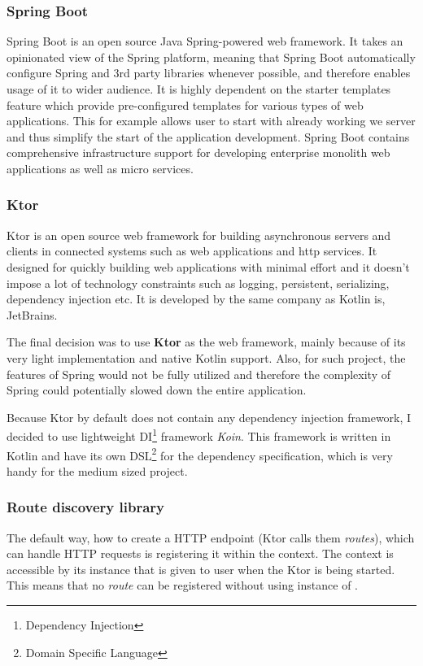 \subsubsection{Spring Boot}
Spring Boot\cite{springBootReference} is an open source Java Spring-powered web framework.
It takes an opinionated view of the Spring platform,
meaning that Spring Boot automatically configure Spring and 3rd party libraries whenever possible,
and therefore enables usage of it to wider audience.
It is highly dependent on the starter templates feature which provide pre-configured templates for various types of web applications.
This for example allows user to start with already working we server
and thus simplify the start of the application development\cite{springBootGithubReference}.
Spring Boot contains comprehensive infrastructure support for developing enterprise monolith web applications as well as micro services\cite{springBootGithubReference}.

\subsubsection{Ktor}\label{subsubsec:ktor}
Ktor\cite{ktorWebPage} is an open source web framework for building asynchronous servers 
and clients in connected systems such as web applications and http services.
It designed for quickly building web applications with minimal effort 
and it doesn't impose a lot of technology constraints such as logging, persistent, serializing, dependency injection etc.\cite{ktorApiReference}
It is developed by the same company as Kotlin is, JetBrains.


\bigskip
The final decision was to use \textbf{Ktor} as the web framework,
mainly because of its very light implementation and native Kotlin support.
Also, for such project, 
the features of Spring would not be fully utilized
and therefore the complexity of Spring could potentially slowed down the entire application.

Because Ktor by default does not contain any dependency injection framework, 
I decided to use lightweight DI\footnote{Dependency Injection} framework \textit{Koin}\cite{koinGithub}.
This framework is written in Kotlin and have its own DSL\footnote{Domain Specific Language} for the dependency specification,
which is very handy for the medium sized project.

\subsubsection{Route discovery library}
The default way, how to create a HTTP endpoint (Ktor calls them \textit{routes}),
which can handle HTTP requests is registering it within the  context.
The  context is accessible by its instance that is given to user when the Ktor is being started.
This means that no \textit{route} can be registered without using instance of .

